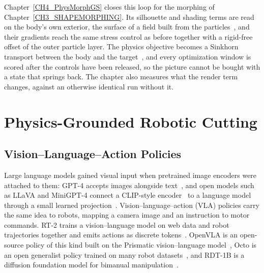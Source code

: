     Chapter~\ref{CH4_PhysMorphGS} closes this loop for the morphing of Chapter~\ref{CH3_SHAPEMORPHING}. Its silhouette and shading terms are read on the body's own exterior, the surface of a field built from the particles~\citep{10.1145/1073204.1073298}, and their gradients reach the same stress control as before together with a rigid-free offset of the outer particle layer. The physics objective becomes a Sinkhorn transport between the body and the target~\citep{feydy2019sinkhorn}, and every optimization window is scored after the controls have been released, so the picture cannot be bought with a state that springs back. The chapter also measures what the render term changes, against an otherwise identical run without it.

\section{Physics-Grounded Robotic Cutting}
\subsection{Vision--Language--Action Policies}
    Large language models gained visual input when pretrained image encoders were attached to them: GPT-4 accepts images alongside text~\citep{achiam2023gpt}, and open models such as LLaVA and MiniGPT-4 connect a CLIP-style encoder~\citep{radford2021clip} to a language model through a small learned projection~\citep{liu2023llava,zhu2023minigpt4}. Vision--language--action (VLA) policies carry the same idea to robots, mapping a camera image and an instruction to motor commands. RT-2 trains a vision--language model on web data and robot trajectories together and emits actions as discrete tokens~\citep{rt2}. OpenVLA is an open-source policy of this kind built on the Prismatic vision--language model~\citep{openvla,prismaticvlm}, Octo is an open generalist policy trained on many robot datasets~\citep{mees2024octo}, and RDT-1B is a diffusion foundation model for bimanual manipulation~\citep{liu2025rdt1bdiffusionfoundationmodel}.

